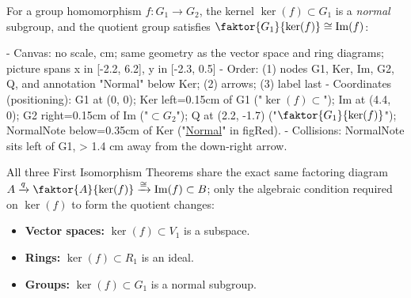 \begin{content}
For a group homomorphism $f \colon G_1 \to G_2$, the kernel $\ker(f) \subset G_1$ is a \emph{normal} subgroup, and the quotient group satisfies $\faktor{G_1}{\ker(f)} \cong \operatorname{Im}(f)$:

\begin{hidden}
- Canvas: no scale, cm; same geometry as the vector space and ring diagrams; picture spans x in [-2.2, 6.2], y in [-2.3, 0.5]
- Order: (1) nodes G1, Ker, Im, G2, Q, and annotation "Normal" below Ker; (2) arrows; (3) label \cong last
- Coordinates (positioning):
  G1 at (0, 0); Ker left=0.15cm of G1 ("$\ker(f) \subset$");
  Im at (4.4, 0); G2 right=0.15cm of Im ("$\subset G_2$");
  Q at (2.2, -1.7) ("$\faktor{G_1}{\ker(f)}$");
  NormalNote below=0.35cm of Ker ("\underline{Normal}" in figRed).
- Collisions: NormalNote sits left of G1, > 1.4 cm away from the down-right arrow.
\end{hidden}
\begin{center}
\end{center}

\begin{steps}
All three First Isomorphism Theorems share the exact same factoring diagram $A \xrightarrow{q} \faktor{A}{\ker(f)} \xrightarrow{\cong} \operatorname{Im}(f) \subset B$; only the algebraic condition required on $\ker(f)$ to form the quotient changes:
\begin{itemize}
    \item \textbf{Vector spaces:} $\ker(f) \subset V_1$ is a subspace.
    \item \textbf{Rings:} $\ker(f) \subset R_1$ is an ideal.
    \item \textbf{Groups:} $\ker(f) \subset G_1$ is a normal subgroup.
\end{itemize}
\end{steps}


\end{content}
